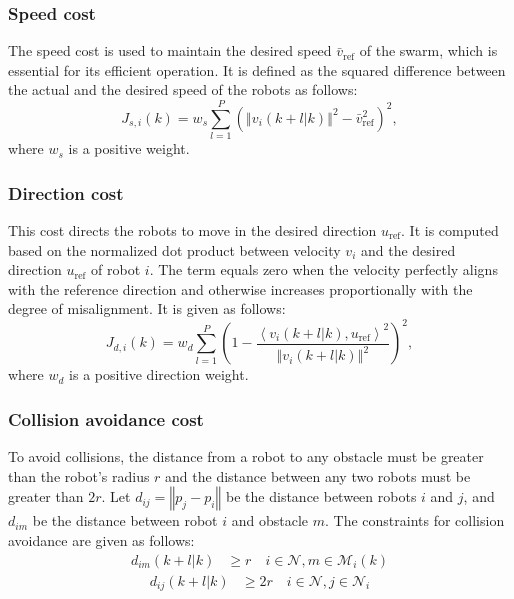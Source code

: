 \subsubsection{Speed cost}
The speed cost is used to maintain the desired speed $\bar{v}_\text{ref}$ of the swarm, which is essential for its efficient operation. It is defined as the squared difference between the actual and the desired speed of the robots as follows:
\begin{equation}
    J_{s,i}(k)=w_s\sum_{l=1}^P\left(\left\Vert v_i(k+l|k)\right\Vert^2-\bar{v}_\text{ref}^2\right)^2,
\end{equation}
where $w_s$ is a positive weight.

\subsubsection{Direction cost}
This cost directs the robots to move in the desired direction $u_\text{ref}$. It is computed based on the normalized dot product between velocity $v_i$ and the desired direction $u_\text{ref}$ of robot $i$. The term equals zero when the velocity perfectly aligns with the reference direction and otherwise increases proportionally with the degree of misalignment. It is given as follows:
\begin{equation}
    J_{d,i}(k)=w_d\sum_{l=1}^P{\left(1-\dfrac{\left\langle v_i\left(k+l|k\right),u_\text{ref}\right\rangle^2}{\left\Vert v_i(k+l|k)\right\Vert^2}\right)^2},
\end{equation}
where $w_d$ is a positive direction weight.

\subsubsection{Collision avoidance cost}
To avoid collisions, the distance from a robot to any obstacle must be greater than the robot's radius $r$ and the distance between any two robots must be greater than $2r$. Let $d_{ij}=\left\Vert p_j-p_i\right\Vert$ be the distance between robots $i$ and $j$, and $d_{im}$ be the distance between robot $i$ and obstacle $m$. The constraints for collision avoidance  are given as follows:
\begin{equation}
\begin{aligned}
    d_{im}(k+l|k)&\geq r \quad i\in\mathcal{N}, m\in\mathcal{M}_i(k)
    \label{eqn:obsContraint}
\end{aligned}
\end{equation}
\begin{equation}
\begin{aligned}
    d_{ij}(k+l|k)&\geq 2r \quad i\in\mathcal{N},j\in\mathcal{N}_i
    \label{eqn:robotContraint}
\end{aligned}
\end{equation}

